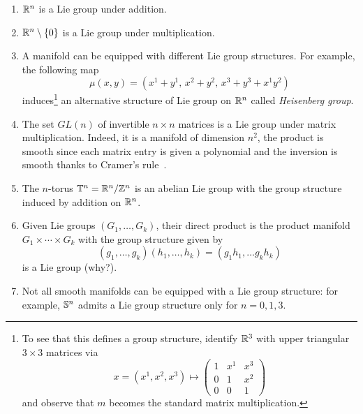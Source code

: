 \begin{example}
	\begin{enumerate}
		\item $\mathbb{R}^n$ is a Lie group under addition.
		\item $\mathbb{R}^n\setminus\{0\}$ is a Lie group under multiplication.
		\item A manifold can be equipped with different Lie group structures. For example, the following map
		      \begin{equation}
			      \mu(x,y) = (x^1+y^1,\, x^2+y^2,\, x^3+y^3+x^1y^2)
		      \end{equation}
		      induces\footnote{To see that this defines a group structure, identify $\mathbb{R}^3$ with upper triangular $3\times3$ matrices via
			      \begin{equation}\nonumber
				      x = (x^1, x^2, x^3) \mapsto \begin{pmatrix}
					      1 & x^1 & x^3 \\
					      0 & 1   & x^2 \\
					      0 & 0   & 1
				      \end{pmatrix}
			      \end{equation}
			      and observe that $m$ becomes the standard matrix multiplication.} an alternative structure of Lie group on $\mathbb{R}^n$ called \emph{Heisenberg group}.
		\item The set $GL(n)$ of invertible $n\times n$ matrices is a Lie group under matrix multiplication. Indeed, it is a manifold of dimension $n^2$, the product is smooth since each matrix entry is given a polynomial and the inversion is smooth thanks to Cramer's rule~\cite[Proposition B.36]{book:lee}.
		\item The $n$-torus $\mathbb{T}^n = \mathbb{R}^n/\mathbb{Z}^n$ is an abelian Lie group with the group structure induced by addition on $\mathbb{R}^n$.
		\item Given Lie groups $(G_1, \ldots, G_k)$, their direct product is the product manifold $G_1\times \cdots\times G_k$ with the group structure given by
		      \begin{equation}
			      (g_1, \ldots, g_k)(h_1,\ldots,h_k) = (g_1h_1, \ldots g_kh_k)
		      \end{equation}
		      is a Lie group (why?).
		\item Not all smooth manifolds can be equipped with a Lie group structure: for example, $\mathbb{S}^n$ admits a Lie group structure only for $n=0,1,3$.
	\end{enumerate}
\end{example}

